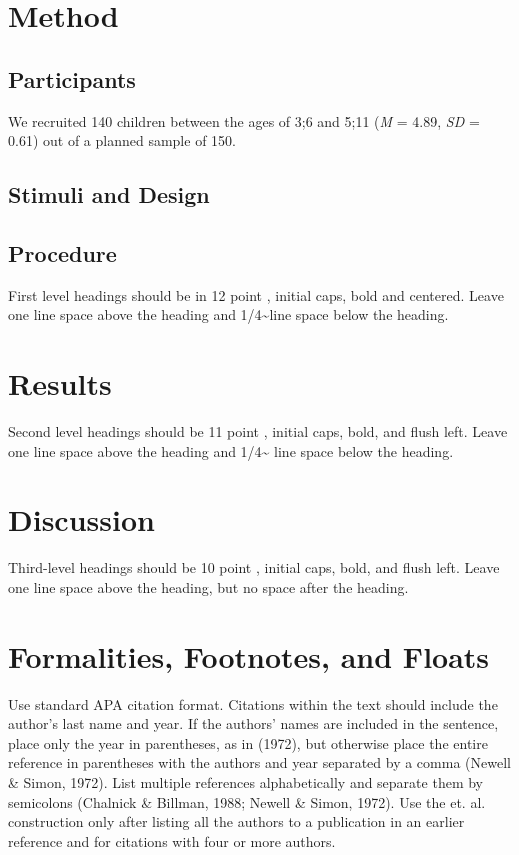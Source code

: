 \documentclass[10pt, letterpaper]{article}
\begin{document}
\section{Method}\label{method}

\subsection{Participants}\label{participants}

We recruited 140 children between the ages of 3;6 and 5;11 (\emph{M} =
4.89, \emph{SD} = 0.61) out of a planned sample of 150.

\subsection{Stimuli and Design}\label{stimuli-and-design}

\subsection{Procedure}\label{procedure}

First level headings should be in 12 point , initial caps, bold and
centered. Leave one line space above the heading and
1/4\textasciitilde{}line space below the heading.

\section{Results}\label{results}

Second level headings should be 11 point , initial caps, bold, and flush
left. Leave one line space above the heading and 1/4\textasciitilde{}
line space below the heading.

\section{Discussion}\label{discussion}

Third-level headings should be 10 point , initial caps, bold, and flush
left. Leave one line space above the heading, but no space after the
heading.

\section{Formalities, Footnotes, and
Floats}\label{formalities-footnotes-and-floats}

Use standard APA citation format. Citations within the text should
include the author's last name and year. If the authors' names are
included in the sentence, place only the year in parentheses, as in
(1972), but otherwise place the entire reference in parentheses with the
authors and year separated by a comma (Newell \& Simon, 1972). List
multiple references alphabetically and separate them by semicolons
(Chalnick \& Billman, 1988; Newell \& Simon, 1972). Use the et. al.
construction only after listing all the authors to a publication in an
earlier reference and for citations with four or more authors.
\end{document}
